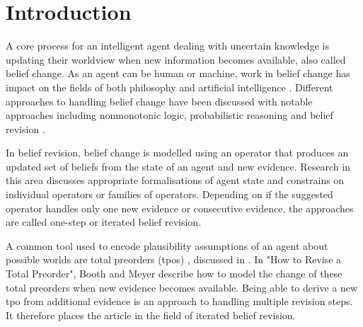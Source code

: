 \documentclass[english, 12pt]{scrartcl}
\theoremstyle{definition}
\theoremstyle{definition}
\theoremstyle{definition}
\begin{document}
\newpage

\tableofcontents

\newpage

\section{Introduction}
A core process for an intelligent agent dealing with uncertain knowledge is updating their worldview when new information becomes available, also called belief change. As an agent can be human or machine, work in belief change has impact on the fields of both philosophy and artificial intelligence \cite{Ferme2011}. Different approaches to handling belief change have been discussed with notable approaches including nonmonotonic logic, probabilistic reasoning and belief revision \cite{Darwiche1997}.

In belief revision, belief change is modelled using an operator that produces an updated set of beliefs from the state of an agent and new evidence. Research in this area discusses appropriate formalisations of agent state and constrains on individual operators or families of operators. Depending on if the suggested operator handles only one new evidence or consecutive evidence, the approaches are called one-step or iterated belief revision.


A common tool used to encode plausibility assumptions of an agent about possible worlds are total preorders (tpos) \cite{Booth2011}, discussed in \cite{Katsuno1991}. In "How to Revise a Total Preorder", Booth and Meyer describe how to model the change of these total preorders when new evidence becomes available. Being able to derive a new tpo from additional evidence is an approach to handling multiple revision steps. It therefore places the article in the field of iterated belief revision.
\end{document}
